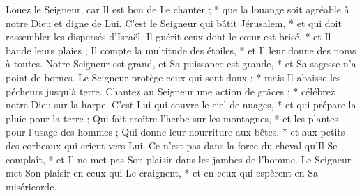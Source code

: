  Louez le Seigneur, car Il est bon de Le chanter ; * que la louange soit agréable à notre Dieu et digne de Lui.
\versseparator
 C'est le Seigneur qui bâtit Jérusalem, * et qui doit rassembler les dispersés d'Israël.
\versseparator
 Il guérit ceux dont le cœur est brisé, * et Il bande leurs plaies ;
\versseparator
 Il compte la multitude des étoiles, * et Il leur donne des noms à toutes.
\versseparator
 Notre Seigneur est grand, et Sa puissance est grande, * et Sa sagesse n'a point de bornes.
\versseparator
 Le Seigneur protège ceux qui sont doux ; * mais Il abaisse les pécheurs jusqu'à terre.
\versseparator
 Chantez au Seigneur une action de grâces ; * célébrez notre Dieu sur la harpe.
\versseparator
 C'est Lui qui couvre le ciel de nuages, * et qui prépare la pluie pour la terre ;
\versseparator
 Qui fait croître l'herbe sur les montagnes, * et les plantes pour l'usage des hommes ;
\versseparator
 Qui donne leur nourriture aux bêtes, * et aux petits des corbeaux qui crient vers Lui.
\versseparator
 Ce n'est pas dans la force du cheval qu'Il Se complaît, * et Il ne met pas Son plaisir dans les jambes de l'homme.
\versseparator
 Le Seigneur met Son plaisir en ceux qui Le craignent, * et en ceux qui espèrent en Sa miséricorde.